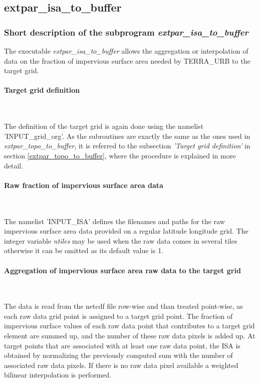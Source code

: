 \documentclass[a4paper,10pt,DIV14,BCOR1cm,titlepage,twoside]{scrartcl}
\begin{document}
\subsection{extpar\_isa\_to\_buffer}\label{extpar_isa_to_buffer}
\subsubsection{Short description of the subprogram \textit{extpar\_isa\_to\_buffer}}
The executable \textit{extpar\_isa\_to\_buffer} allows the aggregation or interpolation of data on the fraction of impervious surface area needed by TERRA\_URB to the target grid. \par\medskip\noindent
\paragraph{Target grid definition} \ \par\medskip\noindent
The definition of the target grid is again done using the namelist 'INPUT\_grid\_org'. As the subroutines are exactly the same as the ones used in \textit{extpar\_topo\_to\_buffer}, it is referred to the subsection \textit{'Target grid definition'} in section \ref{extpar_topo_to_buffer}, where the procedure is explained in more detail. \par\medskip\noindent
\paragraph{Raw fraction of impervious surface area data}\ \par\medskip\noindent
The namelist 'INPUT\_ISA' defines the filenames and paths for the raw impervious surface area data provided on a regular latitude longitude grid. The integer variable \textit{ntiles} may be used when the raw data comes in several tiles otherwise it can be omitted as its default value is 1.\par\medskip\noindent
\paragraph{Aggregation of impervious surface area  raw data to the target grid} \ \par\medskip\noindent
The data is read from the netcdf file row-wise and than treated point-wise, as each raw data grid point is assigned to a target grid point. The fraction of impervious surface values of each raw data point that contributes to a target grid element are summed up, and the number of these raw data pixels is added up. At target points that are associated with at least one raw data point, the ISA is obtained by normalizing the previously computed sum with the number of associated raw data pixels. If there is no raw data pixel available a weighted bilinear interpolation is performed.\par\medskip\noindent
\end{document}
